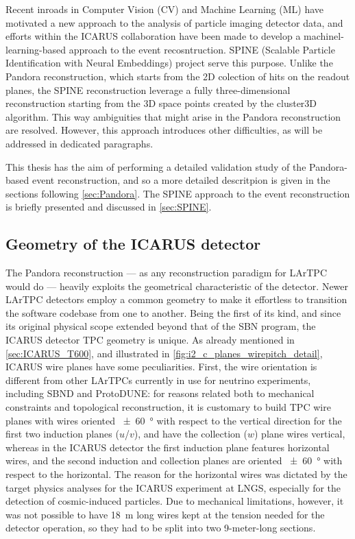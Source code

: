 Recent inroads in Computer Vision (CV) and Machine Learning (ML) have motivated a new approach to the analysis of particle imaging detector data, and efforts within the ICARUS collaboration have been made to develop a machinel-learning-based approach to the event recosntruction. SPINE (Scalable Particle Identification with Neural Embeddings) project serve this purpose. Unlike the Pandora reconstruction, which starts from the 2D colection of hits on the readout planes, the SPINE reconstruction leverage a fully three-dimensional reconstruction starting from the 3D space points created by the cluster3D algorithm. This way ambiguities that might arise in the Pandora reconstruction are resolved. However, this approach introduces other difficulties, as will be addressed in dedicated paragraphs. 

This thesis has the aim of performing a detailed validation study of the Pandora-based event reconstruction, and so a more detailed descritpion is given in the sections following \autoref{sec:Pandora}. The SPINE approach to the event reconstruction is briefly presented and discussed in \autoref{sec:SPINE}.

\subsection{Geometry of the ICARUS detector}

The Pandora reconstruction --- as any reconstruction paradigm for LArTPC would do --- heavily exploits the geometrical characteristic of the detector. Newer LArTPC detectors employ a common geometry to make it effortless to transition the software codebase from one to another. Being the first of its kind, and since its original physical scope extended beyond that of the SBN program, the ICARUS detector TPC geometry is unique. As already mentioned in \autoref{sec:ICARUS_T600}, and illustrated in \autoref{fig:i2_c_planes_wirepitch_detail}, ICARUS wire planes have some peculiarities. First, the wire orientation is different from other LArTPCs currently in use for neutrino experiments, including SBND and ProtoDUNE: for reasons related both to mechanical constraints and topological reconstruction, it is customary to build TPC wire planes with wires oriented \SI{+-60}{\degree} with respect to the vertical direction for the first two induction planes ($u$/$v$), and have the collection ($w$) plane wires vertical, whereas in the ICARUS detector the first induction plane features horizontal wires, and the second induction and collection planes are oriented \SI{+-60}{\degree} with respect to the horizontal. The reason for the horizontal wires was dictated by the target physics analyses for the ICARUS experiment at LNGS, especially for the detection of cosmic-induced particles. Due to mechanical limitations, however, it was not possible to have \SI{18}{\metre} long wires kept at the tension needed for the detector operation, so they had to be split into two 9-meter-long sections. 

